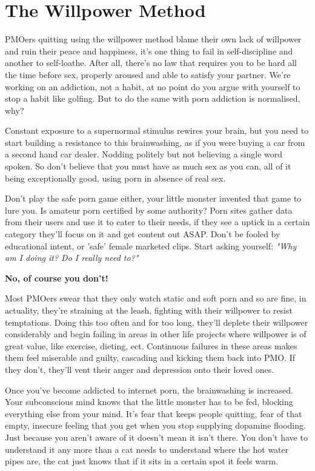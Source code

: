 \documentclass[easypeasy.tex]{subfiles}
\begin{document}
\section{The Willpower Method}
PMOers quitting using the willpower method blame their own lack of willpower and ruin their peace and happiness, it's one thing to fail in self-discipline and another to self-loathe. After all, there's no law that requires you to be hard all the time before sex, properly aroused and able to satisfy your partner. We're working on an addiction, not a habit, at no point do you argue with yourself to stop a habit like golfing. But to do the same with porn addiction is normalised, why?

Constant exposure to a supernormal stimulus rewires your brain, but you need to start building a resistance to this brainwashing, as if you were buying a car from a second hand car dealer. Nodding politely but not believing a single word spoken. So don't believe that you must have as much sex as you can, all of it being exceptionally good, using porn in absence of real sex.

Don't play the safe porn game either, your little monster invented that game to lure you. Is amateur porn certified by some authority? Porn sites gather data from their users and use it to cater to their needs, if they see a uptick in a certain category they'll focus on it and get content out ASAP. Don't be fooled by educational intent, or 'safe' female marketed clips. Start asking yourself: \textit{"Why am I doing it? Do I really need to?"}

\textbf{No, of course you don't!}

Most PMOers swear that they only watch static and soft porn and so are fine, in actuality, they're straining at the leash, fighting with their willpower to resist temptations. Doing this too often and for too long, they'll deplete their willpower considerably and begin failing in areas in other life projects where willpower is of great value, like exercise, dieting, ect. Continuous failures in these areas makes them feel miserable and guilty, cascading and kicking them back into PMO. If they don't, they'll vent their anger and depression onto their loved ones.

Once you've become addicted to internet porn, the brainwashing is increased. Your subconscious mind knows that the little monster has to be fed, blocking everything else from your mind. It's fear that keeps people quitting, fear of that empty, insecure feeling that you get when you stop supplying dopamine flooding. Just because you aren't aware of it doesn't mean it isn't there. You don't have to understand it any more than a cat needs to understand where the hot water pipes are, the cat just knows that if it sits in a certain spot it feels warm.
\end{document}
